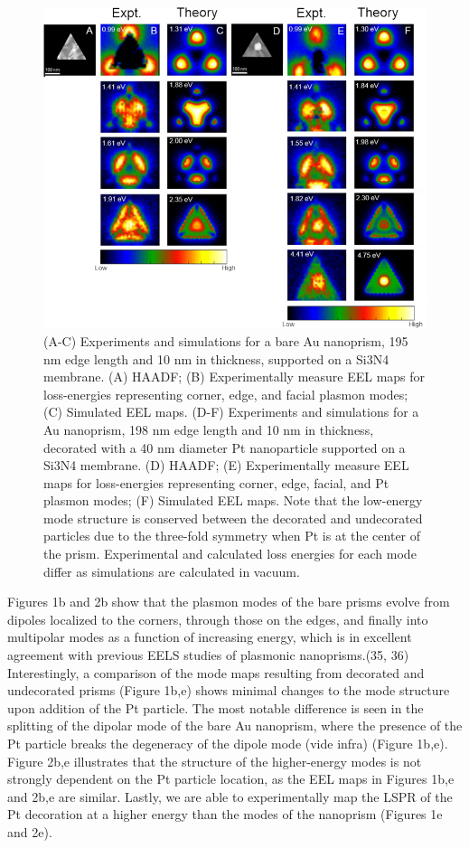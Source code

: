 \documentclass [11pt, proquest] {uwthesis}[2016/11/22]
\begin{document}
\begin{figure}
\includegraphics{prisms_mode_maps_center.png}
\caption{(A-C) Experiments and simulations for a bare Au nanoprism, 195 nm edge length and 10 nm in thickness, supported on a Si3N4 membrane. (A) HAADF; (B) Experimentally measure EEL maps for loss-energies representing corner, edge, and facial plasmon modes; (C) Simulated EEL maps. (D-F) Experiments and simulations for a Au nanoprism, 198 nm edge length and 10 nm in thickness, decorated with a 40 nm diameter Pt nanoparticle supported on a Si3N4 membrane. (D) HAADF; (E) Experimentally measure EEL maps for loss-energies representing corner, edge, facial, and Pt plasmon modes; (F) Simulated EEL maps. Note that the low-energy mode structure is conserved between the decorated and undecorated particles due to the three-fold symmetry when Pt is at the center of the prism. Experimental and calculated loss energies for each mode differ as simulations are calculated in vacuum.}
\label{modes_center}
\end{figure}

Figures 1b and 2b show that the plasmon modes of the bare prisms evolve from dipoles localized to the corners, through those on the edges, and finally into multipolar modes as a function of increasing energy, which is in excellent agreement with previous EELS studies of plasmonic nanoprisms.(35, 36) Interestingly, a comparison of the mode maps resulting from decorated and undecorated prisms (Figure 1b,e) shows minimal changes to the mode structure upon addition of the Pt particle. The most notable difference is seen in the splitting of the dipolar mode of the bare Au nanoprism, where the presence of the Pt particle breaks the degeneracy of the dipole mode (vide infra) (Figure 1b,e). Figure 2b,e illustrates that the structure of the higher-energy modes is not strongly dependent on the Pt particle location, as the EEL maps in Figures 1b,e and 2b,e are similar. Lastly, we are able to experimentally map the LSPR of the Pt decoration at a higher energy than the modes of the nanoprism (Figures 1e and 2e).
\end{document}
